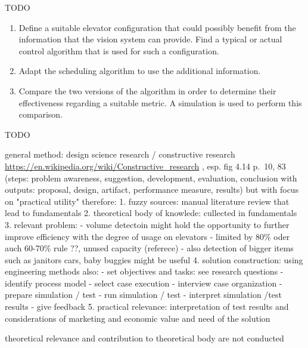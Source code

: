 TODO

\begin{enumerate}
    \item Define a suitable elevator configuration that could possibly benefit from the information that the vision system can provide. 
    Find a typical or actual control algorithm that is used for such a configuration.
    \item Adapt the scheduling algorithm to use the additional information.
    \item Compare the two versions of the algorithm in order to determine their effectiveness regarding a suitable metric.
    A simulation is used to perform this comparison.
\end{enumerate}

TODO




general method:
design science research / constructive research
\url{https://en.wikipedia.org/wiki/Constructive_research}
\autocite[][pp.67--100]{dresh2015designresearch}, esp. fig 4.14 p.~10, 83 (steps: problem awareness, suggestion, development, evaluation, conclusion with outputs: proposal, design, artifact, performance measure, results)
but with focus on "practical utility"
therefore:
1. fuzzy sources: manual literature review that lead to fundamentals
2. theoretical body of knowlede: cullected in fundamentals
3. relevant problem: 
    - volume detectoin might hold the opportunity to further improve efficiency with the degree of usage on elevators
    - limited by 80\% oder auch 60-70\% rule \autocite[][p.~194]{unger2015aufzuege} ??, unused capacity (referece)
    - also detection of bigger items such as janitors cars, baby buggies  might be useful
4. solution construction: using engineering methods
    also:    
    - set objectives and tasks: see research questions
    - identify process model
    - select case execution
    - interview case organization
    - prepare simulation / test
    - run simulation / test
    - interpret simulation /test results
    - give feedback
5. practical relevance: interpretation of test results and considerations of marketing and economic value and need of the solution

theoretical relevance and contribution to theoretical body are not conducted

